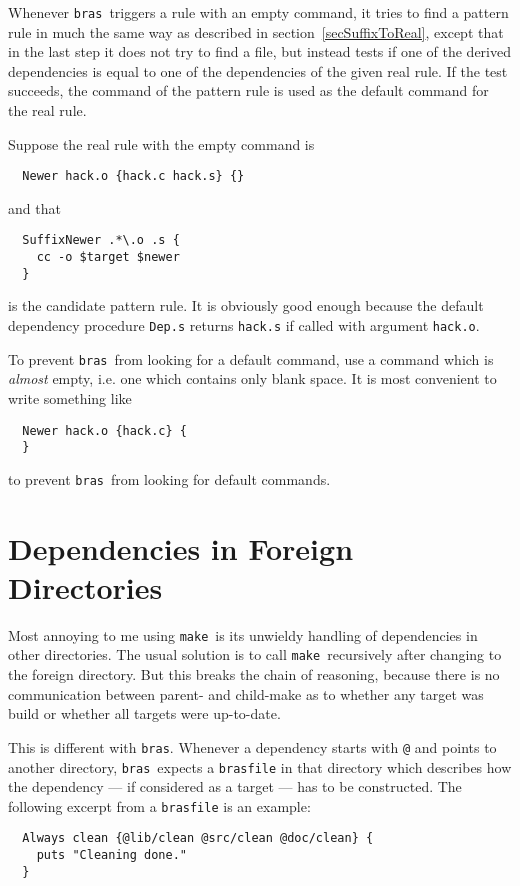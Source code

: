 \documentclass[12pt]{article}
\newcommand{\bras}{\texttt{bras}}
\newcommand{\make}{\texttt{make}}
\begin{document}
Whenever \bras\ triggers a rule with an empty command, it tries to
find a pattern rule in much the same way as described in
section~\ref{secSuffixToReal}, except that in the last step it does
not try to find a file, but instead tests if one of the derived
dependencies is equal to one of the dependencies of the given real
rule. If the test succeeds, the command of the pattern rule is used as
the default command for the real rule.

Suppose the real rule with the empty command is
\begin{verbatim}
  Newer hack.o {hack.c hack.s} {}
\end{verbatim}
and that
\begin{verbatim}
  SuffixNewer .*\.o .s {
    cc -o $target $newer
  }
\end{verbatim}
is the candidate pattern rule. It is obviously good enough
because the default dependency procedure \texttt{Dep.s} returns
\texttt{hack.s} if called with argument \texttt{hack.o}.

To prevent \bras\ from looking for a default command, use a command
which is \textit{almost} empty, i.e. one which contains only blank
space. It is most convenient to write something like
\begin{verbatim}
  Newer hack.o {hack.c} {
  }
\end{verbatim}
to prevent \bras\ from looking for default commands.

\section{Dependencies in Foreign Directories}

Most annoying to me using \make\ is its unwieldy handling of
dependencies in other directories. The usual solution is to call
\make\ recursively after changing to the foreign directory. But this
breaks the chain of reasoning, because there is no communication
between parent- and child-make as to whether any target was build or
whether all targets were up-to-date.

This is different with \bras. Whenever a dependency starts with
\texttt{@} and points to another directory, \bras\ expects
a \texttt{brasfile} in that directory which describes how the
dependency --- if considered as a target --- has to be constructed.
The following excerpt from a \texttt{brasfile} is an example:

\begin{verbatim}
  Always clean {@lib/clean @src/clean @doc/clean} {
    puts "Cleaning done."
  }
\end{verbatim}
\end{document}
